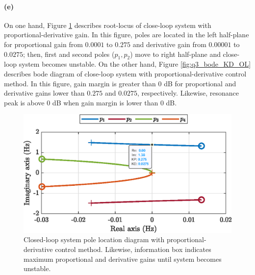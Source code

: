 \paragraph{(e)} On one hand,  Figure  \ref{fig:q3_rlocus_KD_CL} describes root-locus of close-loop system with proportional-derivative gain. In this figure, poles are located in the left half-plane for proportional gain from $0.0001$ to $0.275$ and derivative gain from $0.00001$ to $0.0275$; then, first and second poles ($p_1, p_2$) move to right half-plane and close-loop system becomes unstable. On the other hand, Figure \ref{fig:q3_bode_KD_OL} describes bode diagram of close-loop system with proportional-derivative control method. In this figure, gain margin is greater than $0$ dB for proportional and derivative gains lower than $0.275$ and $0.0275$, respectively. Likewise, resonance peak is above $0$  dB when gain margin is lower than $0$ dB.


\begin{figure}[h!]
	\centering
	\includegraphics{images/question3/q3_rlocus_KD_CL.eps}
	\caption{Closed-loop system pole location diagram with proportional-derivative control method. Likewise, information box indicates maximum proportional and derivative gains until system becomes unstable.}
	\label{fig:q3_rlocus_KD_CL}
\end{figure}


